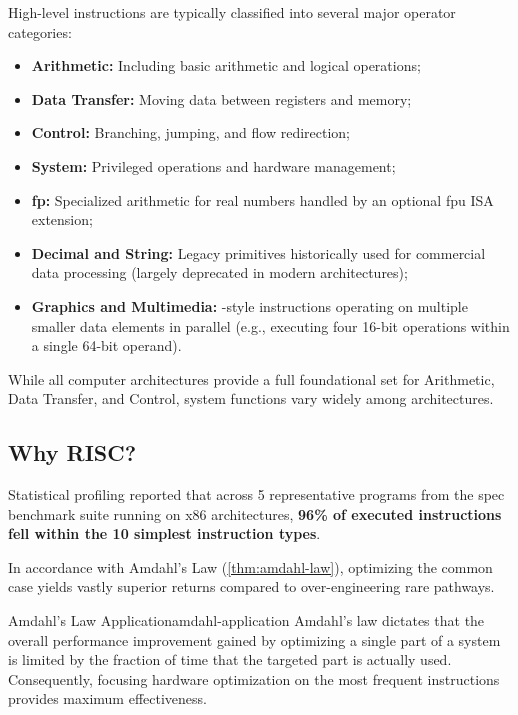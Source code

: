 \noindent High-level instructions are typically classified into several major operator categories:
\begin{itemize}
    \item \textbf{Arithmetic:} Including basic arithmetic and logical operations;
    \item \textbf{Data Transfer:} Moving data between registers and memory;
    \item \textbf{Control:} Branching, jumping, and flow redirection;
    \item \textbf{System:} Privileged operations and hardware management;
    \item \textbf{\gls{fp}:} Specialized arithmetic for real numbers handled by an optional \gls{fpu} ISA extension;
    \item \textbf{Decimal and String:} Legacy primitives historically used for commercial data processing (largely deprecated in modern architectures);
    \item \textbf{Graphics and Multimedia:} -style instructions operating on multiple smaller data elements in parallel (e.g., executing four 16-bit operations within a single 64-bit operand).
\end{itemize}
While all computer architectures provide a full foundational set for Arithmetic, Data Transfer, and Control, system functions vary widely among architectures.

\subsection{Why RISC?} 
Statistical profiling reported that across 5 representative programs from the \gls{spec} benchmark suite running on x86 architectures, \textbf{96\% of executed instructions fell within the 10 simplest instruction types}. 

In accordance with Amdahl's Law (\cref{thm:amdahl-law}), optimizing the common case yields vastly superior returns compared to over-engineering rare pathways. 

\begin{observation}{Amdahl's Law Application}{amdahl-application}
    Amdahl's law dictates that the overall performance improvement gained by optimizing a single part of a system is limited by the fraction of time that the targeted part is actually used. Consequently, focusing hardware optimization on the most frequent instructions provides maximum effectiveness.
\end{observation}

